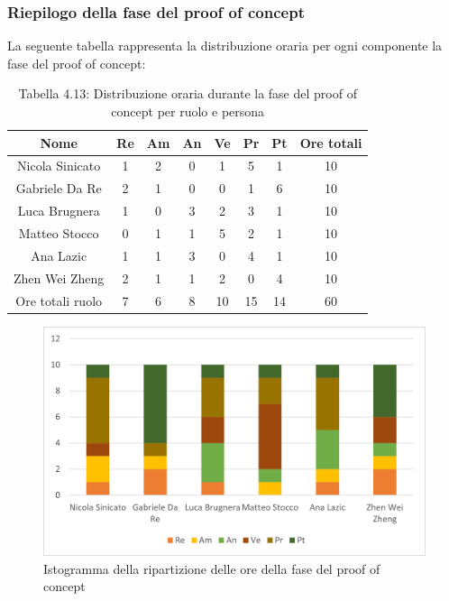 \subsubsection{Riepilogo della fase del proof of concept}
%
La seguente tabella rappresenta la distribuzione oraria per ogni componente la fase del proof of concept:
\begin{table}[h]
	\setlength\extrarowheight{5pt}
	\centering
	\begin{tabularx}{\textwidth}{|ccccccc|c|}
		\hline
		\rowcolor{white}
		\textbf{Nome} & \textbf{Re} & \textbf{Am} & \textbf{An} & \textbf{Ve} & \textbf{Pr}& \textbf{Pt} & \textbf{Ore totali} \\
		\hline
		Nicola Sinicato &1&2&0&1&5&1&10 \\
		Gabriele Da Re &2&1&0&0&1&6&10 \\
		Luca Brugnera &1&0&3&2&3&1&10 \\
		Matteo Stocco &0&1&1&5&2&1&10 \\
		Ana Lazic &1&1&3&0&4&1&10 \\
		Zhen Wei Zheng &2&1&1&2&0&4&10 \\
		\hline
		Ore totali ruolo &7&6&8&10&15&14&60 \\
		\hline
	\end{tabularx}
	\vspace{10pt}
	\caption{Tabella 4.13: Distribuzione oraria durante la fase del proof of concept per ruolo e persona}
\end{table}
\begin{figure}[H]
    \centering
    \includegraphics[scale=0.6]{img/grafi preventivo/istogrammi/proof/complessivo.png}
    \caption{Istogramma della ripartizione delle ore della fase del proof of concept}
\end{figure}
